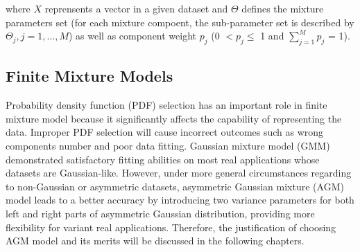 where $X$ reprensents a vector in a given dataset and $\Theta$ defines the mixture parameters set (for each mixture compoent, the sub-parameter set is described by $\Theta_j, j=1,\dots,M$) as well as component weight $p_j$ (0 $< p_j \leq$ 1 and $\sum_{j=1}^Mp_j$ = 1).

\subsection{Finite Mixture Models}
\label{sec:1.2}
Probability density function (PDF) selection has an important role in finite mixture model because it significantly affects the capability of representing the data. Improper PDF selection will cause incorrect outcomes such as wrong components number and poor data fitting. Gaussian mixture model (GMM) \cite{Richardson1997} demonstrated satisfactory fitting abilities on most real applications whose datasets are Gaussian-like. However, under more general circumstances regarding to non-Gaussian or asymmetric datasets, asymmetric Gaussian mixture (AGM) model \cite{Elguebaly2014} leads to a better accuracy by introducing two variance parameters for both left and right parts of asymmetric Gaussian distribution, providing more flexibility for variant real applications. Therefore, the justification of choosing AGM model and its merits will be discussed in the following chapters.

